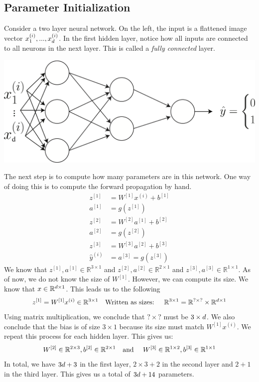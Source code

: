 \documentclass{article}
\numberwithin{equation}{section}
\begin{document}
\subsection{Parameter Initialization}

Consider a two layer neural network. On the left, the input is a flattened image vector $x^{(i)}_{1}, ..., x^{(i)}_{{d}}$. In the first hidden layer, notice how all inputs are connected to all neurons in the next layer. This is called a \textit{fully connected} layer.
\begin{center}
\includegraphics[width=0.80\linewidth]{two_layer_d}\\
\end{center}
The next step is to compute how many parameters are in this network. One way of doing this is to compute the forward propagation by hand.
\begin{align}
z^{[1]} &= W^{[1]} x^{(i)} + b^{[1]} \\
a^{[1]} &= g(z^{[1]}) \\
z^{[2]} &= W^{[2]} a^{[1]} + b^{[2]} \\
a^{[2]} &= g(z^{[2]}) \\ \label{eq:a2}
z^{[3]} &= W^{[3]} a^{[2]} + b^{[3]} \\ \label{eq:z3}
\hat{y}^{(i)} &= a^{[3]} = g(z^{[3]})
\end{align}
We know that $z^{[1]}, a^{[1]}\in \mathbb{R}^{3\times 1} $ and $z^{[2]}, a^{[2]}\in \mathbb{R}^{2\times 1} $  and  $z^{[3]}, a^{[3]}\in \mathbb{R}^{1 \times 1} $.
As of now, we do not know the size of $W^{[1]}$.
However, we can compute its size. We know that $x \in \mathbb{R}^{{d} \times 1}$.
This leads us to the following
\begin{equation}
z^{[1]} = W^{[1]} x^{(i)} \in \mathbb{R}^{3 \times 1} \textrm{\quad Written as sizes: \quad} \mathbb{R}^{3 \times 1} = \mathbb{R}^{? \times ?} \times  \mathbb{R}^{{d} \times 1}
\end{equation}
Using matrix multiplication, we conclude that $? \times ?$ must be $3 \times {d}$. We also conclude that the bias is of size $3 \times 1$ because its size must match $W^{[1]} x^{(i)}$. 
We repeat this process for each hidden layer.
This gives us:
\begin{equation}
W^{[2]} \in \mathbb{R}^{2 \times 3}, b^{[2]} \in \mathbb{R}^{2 \times 1} \textrm{\quad and \quad} W^{[3]} \in \mathbb{R}^{1 \times 2}, b^{[3]} \in \mathbb{R}^{1 \times 1}
\end{equation}
In total, we have $3{d}+3$ in the first layer, $2\times3 + 2$ in the second layer and $2 + 1$ in the third layer. This gives us a total of $3{d} + 14$ parameters.
\end{document}
